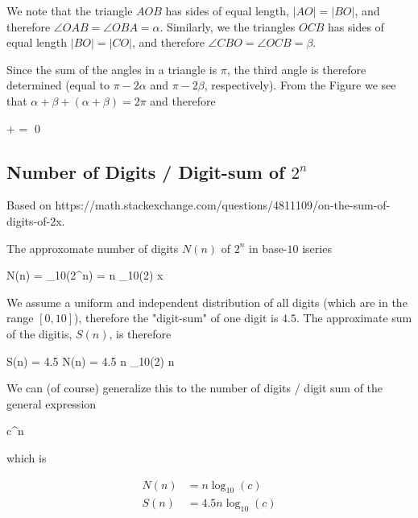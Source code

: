 We note that the triangle $AOB$ has sides of equal length, $|AO| = |BO|$, and therefore $\angle OAB = \angle OBA = \alpha$. Similarly, we the triangles $OCB$ has sides of equal length $|BO| = |CO|$, and therefore $\angle CBO = \angle OCB = \beta$.

Since the sum of the angles in a triangle is $\pi$, the third angle is therefore determined (equal to $\pi - 2\alpha$ and $\pi - 2 \beta$, respectively). From the Figure we see that $\alpha + \beta + (\alpha + \beta) = 2 \pi$ and therefore

\bee
\alpha + \beta = \pi \qed
\eee


\subsection{Number of Digits / Digit-sum of $2^n$}

Based on https://math.stackexchange.com/questions/4811109/on-the-sum-of-digits-of-2x.

The approxomate number of digits $N(n)$ of $2^n$ in base-$10$ iseries

\bee
N(n) = \log_{10}(2^n) = n \log_{10}(2)  x
\eee

We assume a uniform and independent distribution of all digits (which are in the range $[0,10]$), therefore the "digit-sum" of one digit is $4.5$. The approximate sum of the digitis, $S(n)$, is therefore

\bee
S(n) = 4.5 N(n) = 4.5 n \log_{10}(2)  n
\eee

We can (of course) generalize this to the number of digits / digit sum of the general expression

\bee
c^n
\eee

which is

\begin{align*}
N(n) &= n \log_{10}(c) \\
S(n) &= 4.5 n \log_{10}(c)
\end{align*}




